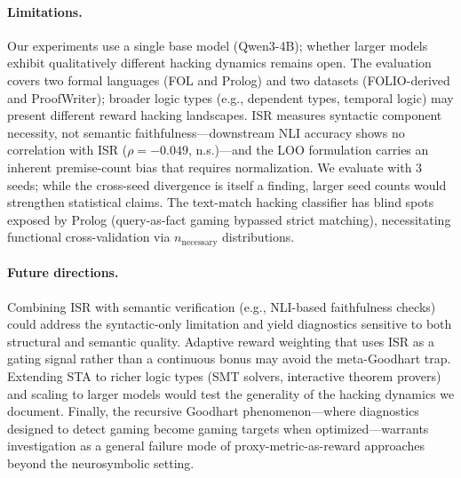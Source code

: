 \paragraph{Limitations.}
Our experiments use a single base model (Qwen3-4B); whether larger models exhibit qualitatively different hacking dynamics remains open.
The evaluation covers two formal languages (FOL and Prolog) and two datasets (FOLIO-derived and ProofWriter); broader logic types (e.g., dependent types, temporal logic) may present different reward hacking landscapes.
ISR measures syntactic component necessity, not semantic faithfulness---downstream NLI accuracy shows no correlation with ISR ($\rho{=}{-}0.049$, n.s.)---and the LOO formulation carries an inherent premise-count bias that requires normalization.
We evaluate with 3 seeds; while the cross-seed divergence is itself a finding, larger seed counts would strengthen statistical claims.
The text-match hacking classifier has blind spots exposed by Prolog (query-as-fact gaming bypassed strict matching), necessitating functional cross-validation via $n_{\text{necessary}}$ distributions.

\paragraph{Future directions.}
Combining ISR with semantic verification (e.g., NLI-based faithfulness checks) could address the syntactic-only limitation and yield diagnostics sensitive to both structural and semantic quality.
Adaptive reward weighting that uses ISR as a gating signal rather than a continuous bonus may avoid the meta-Goodhart trap.
Extending STA to richer logic types (SMT solvers, interactive theorem provers) and scaling to larger models would test the generality of the hacking dynamics we document.
Finally, the recursive Goodhart phenomenon---where diagnostics designed to detect gaming become gaming targets when optimized---warrants investigation as a general failure mode of proxy-metric-as-reward approaches beyond the neurosymbolic setting.
